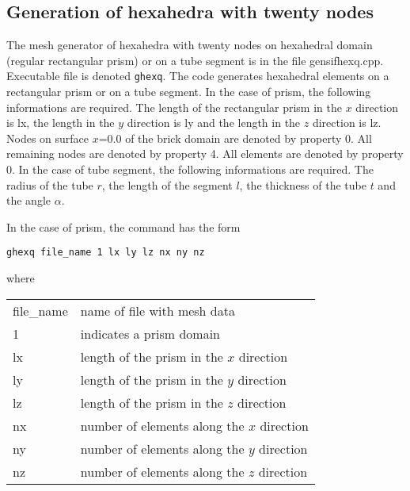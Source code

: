 \documentclass[12pt]{book}
\begin{document}
\subsection{Generation of hexahedra with twenty nodes}

The mesh generator of hexahedra with twenty nodes on hexahedral domain (regular rectangular prism)
or on a tube segment is in the file gensifhexq.cpp.
Executable file is denoted {\tt ghexq}. The code generates hexahedral elements on a rectangular prism
or on a tube segment.
In the case of prism, the following informations are required.
The length of the rectangular prism in the $x$ direction is lx, the length in the $y$ direction is ly and
the length in the $z$ direction is lz. Nodes on surface $x$=0.0 of the brick domain are denoted by property 0.
All remaining nodes are denoted by property 4.
All elements are denoted by property 0.
In the case of tube segment, the following informations are required.
The radius of the tube $r$, the length of the segment $l$, the thickness of the tube $t$ and
the angle $\alpha$.


\vspace{2mm}
\noindent
In the case of prism, the command has the form

{\tt ghexq file\_name  1  lx ly lz nx ny nz}

\vspace{2mm}
\noindent
where

\vspace{2mm}
\noindent
\begin{center}
\begin{tabular}{ll}
file\_name & name of file with mesh data
\\
1 & indicates a prism domain
\\
lx & length of the prism in the $x$ direction
\\
ly & length of the prism in the $y$ direction
\\
lz & length of the prism in the $z$ direction
\\
nx & number of elements along the $x$ direction
\\
ny & number of elements along the $y$ direction
\\
nz & number of elements along the $z$ direction
\end{tabular}
\end{center}
\end{document}
